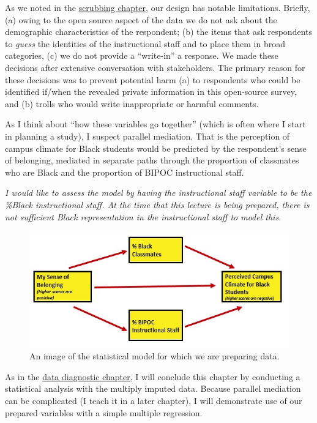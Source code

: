 \documentclass[
  11pt,
]{book}
\begin{document}
As we noted in the \protect\hyperlink{scrub}{scrubbing chapter}, our design has notable limitations. Briefly, (a) owing to the open source aspect of the data we do not ask about the demographic characteristics of the respondent; (b) the items that ask respondents to \emph{guess} the identities of the instructional staff and to place them in broad categories, (c) we do not provide a ``write-in'' a response. We made these decisions after extensive conversation with stakeholders. The primary reason for these decisions was to prevent potential harm (a) to respondents who could be identified if/when the revealed private information in this open-source survey, and (b) trolls who would write inappropriate or harmful comments.

As I think about ``how these variables go together'' (which is often where I start in planning a study), I suspect parallel mediation. That is the perception of campus climate for Black students would be predicted by the respondent's sense of belonging, mediated in separate paths through the proportion of classmates who are Black and the proportion of BIPOC instructional staff.

\emph{I would like to assess the model by having the instructional staff variable to be the \%Black instructional staff. At the time that this lecture is being prepared, there is not sufficient Black representation in the instructional staff to model this.}

\begin{figure}
\centering
\includegraphics{images/Ch04/BlStuMed.jpg}
\caption{An image of the statistical model for which we are preparing data.}
\end{figure}

As in the \protect\hyperlink{DataDx}{data diagnostic chapter}, I will conclude this chapter by conducting a statistical analysis with the multiply imputed data. Because parallel mediation can be complicated (I teach it in a later chapter), I will demonstrate use of our prepared variables with a simple multiple regression.
\end{document}
